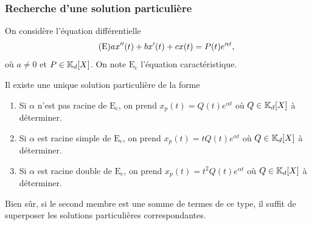 \documentclass{book}
\begin{document}
\subsubsection{Recherche d'une solution particulière}

\begin{Proposition}
%
On considère l'équation différentielle
\[\tag{$\mathrm{E}$} ax''(t) + bx'(t) + cx(t) = P(t) e^{\alpha t},\]
où $a\neq 0$ et $P\in \mathbb{K}     _d[X]$.
On note $\mathrm{E_c}$ l'équation caractéristique.

Il existe une unique solution particulière de la forme
\begin{enumerate}
\item Si $\alpha$ n'est pas racine de $\mathrm{E_c}$,
  on prend $x_p(t) = Q(t) e^{\alpha t}$ où $Q\in \mathbb{K}     _d[X]$ à déterminer.
\item Si $\alpha$ est racine simple de $\mathrm{E_c}$,
  on prend $x_p(t) = tQ(t) e^{\alpha t}$ où $Q\in \mathbb{K}     _d[X]$ à déterminer.
\item Si $\alpha$ est racine double de $\mathrm{E_c}$,
  on prend $x_p(t) = t^2Q(t) e^{\alpha t}$ où $Q\in \mathbb{K}     _d[X]$ à déterminer.
\end{enumerate}
Bien sûr, si le second membre est une somme de termes de ce type,
il suffit de superposer les solutions particulières correspondantes.
\end{Proposition}
%
%
\end{document}
